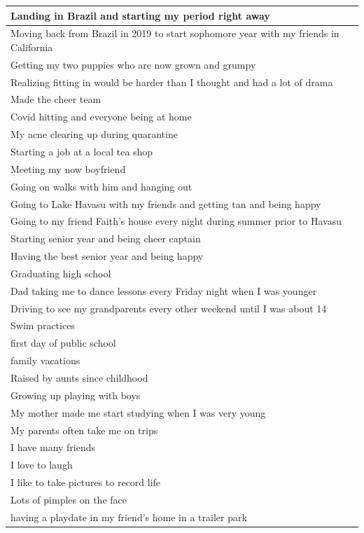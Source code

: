 \documentclass[
  .7em,
  letterpaper,
  DIV=11,
  numbers=noendperiod]{scrartcl}
\begin{document}
\begin{table}
\begin{tabular}{l}
\hline
Landing in Brazil and starting my period right away\\
\hline
Moving back from Brazil in 2019 to start sophomore year with my friends in California\\
\hline
Getting my two puppies who are now grown and grumpy\\
\hline
Realizing fitting in would be harder than I thought and had a lot of drama\\
\hline
Made the cheer team\\
\hline
Covid hitting and everyone being at home\\
\hline
My acne clearing up during quarantine\\
\hline
Starting a job at a local tea shop\\
\hline
Meeting my now boyfriend\\
\hline
Going on walks with him and hanging out\\
\hline
Going to Lake Havasu with my friends and getting tan and being happy\\
\hline
Going to my friend Faith's house every night during summer prior to Havasu\\
\hline
Starting senior year and being cheer captain\\
\hline
Having the best senior year and being happy\\
\hline
Graduating high school\\
\hline
Dad taking me to dance lessons every Friday night when I was younger\\
\hline
Driving to see my grandparents every other weekend until I was about 14\\
\hline
Swim practices\\
\hline
first day of public school\\
\hline
family vacations\\
\hline
Raised by aunts since childhood\\
\hline
Growing up playing with boys\\
\hline
My mother made me start studying when I was very young\\
\hline
My parents often take me on trips\\
\hline
I have many friends\\
\hline
I love to laugh\\
\hline
I like to take pictures to record life\\
\hline
Lots of pimples on the face\\
\hline
having a playdate in my friend's home in a trailer park\\

\end{tabular}
\end{table}
\end{document}
